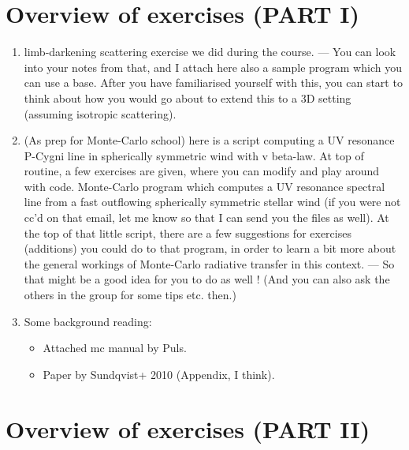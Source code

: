 \documentclass[../main/main.tex]{subfiles}
\begin{document}
\section{Overview of exercises (PART I)}

\begin{enumerate}
\item limb-darkening scattering exercise we did during the course. 
— You can look into your notes from that, and I attach here also a sample program which you can use a base. After you have familiarised yourself with this, you can start to think about how you would go about to extend this to a 3D setting (assuming isotropic scattering). 

\item (As prep for Monte-Carlo school) here is a script computing a UV resonance P-Cygni line in spherically symmetric wind with v beta-law. At top of routine, a few exercises are given, where you can modify and play around with code. Monte-Carlo program which computes a UV resonance spectral line from a fast outflowing spherically symmetric stellar wind (if you were not cc’d on that email, let me know so that I can send you the files as well). At the top of that little script, there are a few suggestions for exercises (additions) you could do to that program, in order to learn a bit more about the general workings of Monte-Carlo radiative transfer in this context.  
— So that might be a good idea for you to do as well !   (And you can also ask the others in the group for some tips etc. then.) 

\item Some background reading: 
\begin{itemize}
\item Attached mc manual by Puls. 
\item Paper by Sundqvist+ 2010 (Appendix, I think). 
\end{itemize}
\end{enumerate}


\section{Overview of exercises (PART II)}
\label{Overview_Part_2}
\end{document}
